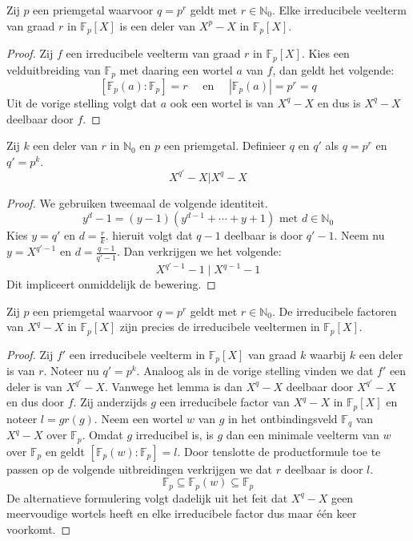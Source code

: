\documentclass[main.tex]{subfiles}
\begin{document}
\begin{st}
  Zij $p$ een priemgetal waarvoor $q=p^{r}$ geldt met $r\in \mathbb{N}_{0}$.
  Elke irreducibele veelterm van graad $r$ in $\mathbb{F}_{p}[X]$ is een deler van $X^{p}-X$ in $\mathbb{F}_{p}[X]$.

  \begin{proof}
    Zij $f$ een irreducibele veelterm van graad $r$ in $\mathbb{F}_{p}[X]$.
    Kies een velduitbreiding van $\mathbb{F}_{p}$ met daaring een wortel $a$ van $f$, dan geldt het volgende:
    \[ [\mathbb{F}_{p}(a):\mathbb{F}_{p}] = r \quad\text{ en }\quad |\mathbb{F}_{p}(a)| = p^{r} = q \]
    Uit de vorige stelling \needed volgt dat $a$ ook een wortel is van $X^{q}-X$ en dus is $X^{q}-X$ deelbaar door $f$.
  \end{proof}
\end{st}

\begin{lem}
  Zij $k$ een deler van $r$ in $\mathbb{N}_{0}$ en $p$ een priemgetal.
  Definieer $q$ en $q'$ als $q=p^{r}$ en $q'=p^{k}$.
  \[ X^{q'}-X | X^{q}-X \]

  \begin{proof}
    We gebruiken tweemaal de volgende identiteit.
    \[ y^{d} - 1= (y-1)(y^{d-1} + \dotsb + y+1) \text{ met } d\in \mathbb{N}_{0} \]
    Kies $y=q'$ en $d=\frac{r}{k}$. hieruit volgt dat $q-1$ deelbaar is door $q'-1$.
    Neem nu $y=X^{q'-1}$ en $d=\frac{q-1}{q'-1}$.
    Dan verkrijgen we het volgende:
    \[ X^{q'-1}-1 \mid X^{q-1}-1 \]
    Dit impliceert onmiddelijk de bewering.
  \end{proof}
\end{lem}

\begin{st}
  Zij $p$ een priemgetal waarvoor $q=p^{r}$ geldt met $r\in \mathbb{N}_{0}$.
  De irreducibele factoren van $X^{q}-X$ in $\mathbb{F}_{p}[X]$ zijn precies de irreducibele veeltermen in $\mathbb{F}_{p}[X]$.

  \begin{proof}
    Zij $f'$ een irreducibele veelterm in $\mathbb{F}_{p}[X]$ van graad $k$ waarbij $k$ een deler is van $r$.
    Noteer nu $q'=p^{k}$.
    Analoog als in de vorige stelling vinden we dat $f'$ een deler is van $X^{q'}-X$.
    Vanwege het lemma is dan $X^{q}-X$ deelbaar door $X^{q'}-X$ en dus door $f$.
    Zij anderzijds $g$ een irreducibele factor van $X^{q}-X$ in $\mathbb{F}_{p}[X]$ en noteer $l=gr(g)$.
    Neem een wortel $w$ van $g$ in het ontbindingsveld $\mathbb{F}_{q}$ van $X^{q}-X$ over $\mathbb{F}_{p}$.
    Omdat $g$ irreducibel is, is $g$ dan een minimale veelterm van $w$ over $\mathbb{F}_{p}$ en geldt $[\mathbb{F}_{p}(w):\mathbb{F}_{p}]=l$.
    Door tenslotte de productformule \needed toe te passen op de volgende uitbreidingen verkrijgen we dat $r$ deelbaar is door $l$.
    \[ \mathbb{F}_{p} \subseteq \mathbb{F}_{p}(w) \subseteq \mathbb{F}_{p} \]
    De alternatieve formulering volgt dadelijk uit het feit dat $X^{q}-X$ geen meervoudige wortels heeft en elke irreducibele factor dus maar \'e\'en keer voorkomt.
  \end{proof}
\end{st}
\end{document}
